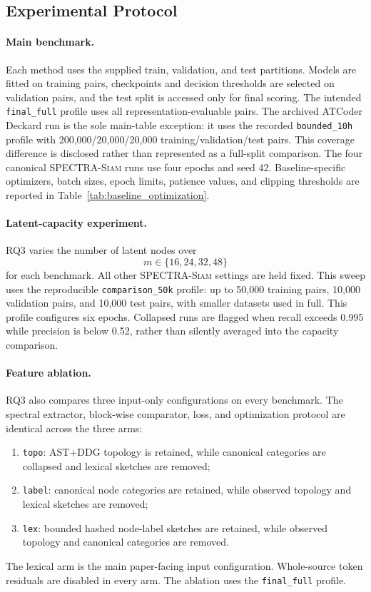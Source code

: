 \documentclass[authoryear,final,5p,times,twocolumn]{elsarticle}
\newcommand{\method}{\textsc{SPECTRA-Siam}}
\newcommand{\added}[1]{{\color{green!50!black}#1}}
\theoremstyle{plain}
\begin{document}
\subsection{Experimental Protocol}
\label{sec:protocol}

\paragraph{Main benchmark.}
Each method uses the supplied train, validation, and test partitions. Models are
fitted on training pairs, checkpoints and decision thresholds are selected on
validation pairs, and the test split is accessed only for final scoring.
\added{The intended \texttt{final\_full} profile uses all representation-evaluable
pairs. The archived ATCoder Deckard run is the sole main-table exception: it uses
the recorded \texttt{bounded\_10h} profile with 200,000/20,000/20,000
training/validation/test pairs. This coverage difference is disclosed rather
than represented as a full-split comparison. The four canonical \method{} runs
use four epochs and seed 42. Baseline-specific optimizers, batch sizes, epoch
limits, patience values, and clipping thresholds are reported in
Table~\ref{tab:baseline_optimization}.}

\begingroup
\color{green!50!black}
\paragraph{Latent-capacity experiment.}
RQ3 varies the number of latent nodes over
\begin{equation}
m\in\{16,24,32,48\}
\end{equation}
for each benchmark. All other \method{} settings are held fixed. This sweep uses
the reproducible \texttt{comparison\_50k} profile: up to 50,000 training pairs,
10,000 validation pairs, and 10,000 test pairs, with smaller datasets used in
full. This profile configures six epochs. Collapsed runs are flagged when recall
exceeds 0.995 while precision is below 0.52, rather than silently averaged into
the capacity comparison.

\paragraph{Feature ablation.}
RQ3 also compares three input-only configurations on every benchmark. The
spectral extractor, block-wise comparator, loss, and optimization protocol are
identical across the three arms:
\begin{enumerate}[leftmargin=*]
\item \texttt{topo}: AST+DDG topology is retained, while canonical categories
are collapsed and lexical sketches are removed;
\item \texttt{label}: canonical node categories are retained, while observed
topology and lexical sketches are removed;
\item \texttt{lex}: bounded hashed node-label sketches are retained, while
observed topology and canonical categories are removed.
\end{enumerate}
The lexical arm is the main paper-facing input configuration. Whole-source
token residuals are disabled in every arm. The ablation uses the
\texttt{final\_full} profile.
\endgroup
\end{document}
